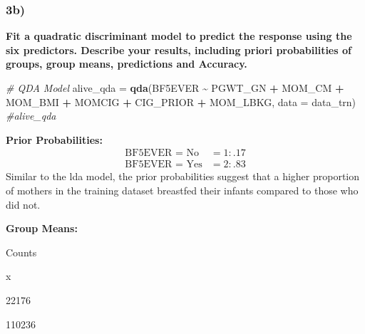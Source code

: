 \documentclass[
]{article}
\newenvironment{Shaded}{\begin{snugshade}}{\end{snugshade}}
\newcommand{\AttributeTok}[1]{\textcolor[rgb]{0.13,0.29,0.53}{#1}}
\newcommand{\CommentTok}[1]{\textcolor[rgb]{0.56,0.35,0.01}{\textit{#1}}}
\newcommand{\FunctionTok}[1]{\textcolor[rgb]{0.13,0.29,0.53}{\textbf{#1}}}
\newcommand{\NormalTok}[1]{#1}
\newcommand{\OtherTok}[1]{\textcolor[rgb]{0.56,0.35,0.01}{#1}}
\newcommand{\SpecialCharTok}[1]{\textcolor[rgb]{0.81,0.36,0.00}{\textbf{#1}}}
\newcommand{\StringTok}[1]{\textcolor[rgb]{0.31,0.60,0.02}{#1}}
\begin{document}
\newpage

\subsubsection{3b)}\label{b-1}

\textbf{Fit a quadratic discriminant model to predict the response using
the six predictors. Describe your results, including priori
probabilities of groups, group means, predictions and Accuracy.}

\begin{Shaded}
\begin{Highlighting}[]
\CommentTok{\# QDA Model}
\NormalTok{alive\_qda }\OtherTok{=} \FunctionTok{qda}\NormalTok{(BF5EVER }\SpecialCharTok{\textasciitilde{}}\NormalTok{ PGWT\_GN }\SpecialCharTok{+}\NormalTok{ MOM\_CM }\SpecialCharTok{+}\NormalTok{ MOM\_BMI }\SpecialCharTok{+}\NormalTok{ MOMCIG }\SpecialCharTok{+}\NormalTok{ CIG\_PRIOR }\SpecialCharTok{+}\NormalTok{ MOM\_LBKG, }\AttributeTok{data =}\NormalTok{ data\_trn)}
\CommentTok{\#alive\_qda}
\end{Highlighting}
\end{Shaded}

\textbf{Prior Probabilities:}\\
\[
\begin{aligned}
   \text{BF5EVER = No}  &= 1: .17 \\
   \text{BF5EVER = Yes} &= 2: .83
\end{aligned}
\] Similar to the lda model, the prior probabilities suggest that a
higher proportion of mothers in the training dataset breastfed their
infants compared to those who did not.

\textbf{Group Means:}\\

\begin{Shaded}
\end{Shaded}

Counts

x

22176

110236

\begin{Shaded}
\end{Shaded}
\end{document}
